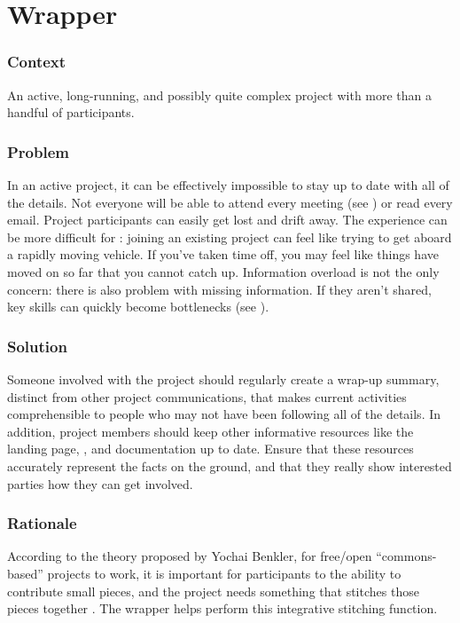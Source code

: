 
\section{Wrapper}\label{sec:Wrapper}

\subsubsection*{Context} An active, long-running, and possibly quite complex project with more than a handful of participants.  

\subsubsection*{Problem} In an active project, it can be effectively impossible to stay up to date with all of the details.  Not everyone will be able to attend every meeting (see ) or read every email.  Project participants can easily get lost and drift away.  The experience can be more difficult for : joining an existing project can feel like trying to get aboard a rapidly moving vehicle.  If you've taken time off, you may feel like things have moved on so far that you cannot catch up.  Information overload is not the only concern: there is also problem with missing information.  If they aren't shared, key skills can quickly become bottlenecks (see ).

\subsubsection*{Solution}
Someone involved with the project should regularly create a wrap-up summary, distinct from other project communications, that makes current activities comprehensible to people who may not have been following all of the details.  In addition, project members should keep other informative resources like the landing page, , and documentation up to date.  Ensure that these resources accurately represent the facts on the ground, and that they really show interested parties how they can get involved.

\subsubsection*{Rationale}
According to the theory proposed by Yochai Benkler, for free/open ``commons-based'' projects to work, it is important for participants to the ability to contribute small pieces, and the project needs something that stitches those pieces together \cite{coases-penguin}.  The wrapper helps perform this integrative stitching function.

